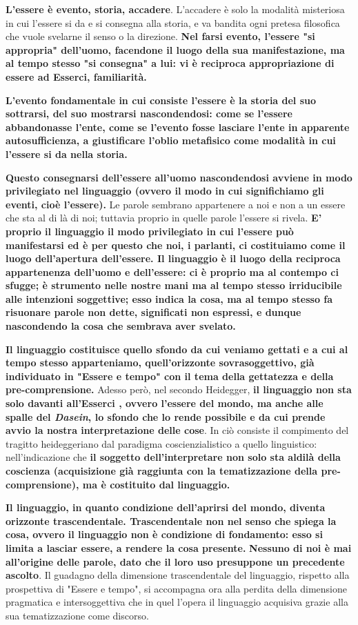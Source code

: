 \textbf{L'essere è evento, storia, accadere}. L'accadere è
solo la modalità misteriosa in cui l'essere si da e si
consegna alla storia, e va bandita ogni pretesa
filosofica che vuole svelarne il senso o la direzione.
\textbf{Nel farsi evento, l'essere "si appropria" dell'uomo,
facendone il luogo della sua manifestazione,
ma al tempo stesso "si consegna" a lui: vi è
reciproca appropriazione di essere ad Esserci,
familiarità.}

\textbf{L'evento fondamentale in cui consiste l'essere è la
storia del suo sottrarsi, del suo mostrarsi nascondendosi:
come se l'essere abbandonasse l'ente, come se
l'evento fosse lasciare l'ente in apparente autosufficienza,
a giustificare l'oblio metafisico come modalità
in cui l'essere si da nella storia.}

\textbf{Questo consegnarsi dell'essere all'uomo nascondendosi avviene in modo privilegiato
nel linguaggio (ovvero il modo in cui significhiamo gli eventi, cioè l'essere).}
Le parole sembrano appartenere a noi e non a un
essere che sta al di là di noi; tuttavia proprio in
quelle parole l'essere si rivela.\textbf{ E' proprio il linguaggio
il modo privilegiato in cui l'essere può manifestarsi
ed è per questo che noi, i parlanti, ci
costituiamo come il luogo dell'apertura
dell'essere.
Il linguaggio è il luogo della reciproca appartenenza dell'uomo e dell'essere: ci è proprio ma
al contempo ci sfugge; è strumento nelle
nostre mani ma al tempo stesso irriducibile alle
intenzioni soggettive; esso indica la cosa, ma
al tempo stesso fa risuonare parole non dette,
significati non espressi, e dunque nascondendo
la cosa che sembrava aver svelato.}

\textbf{Il linguaggio costituisce quello sfondo da cui
veniamo gettati e a cui al tempo stesso
apparteniamo, quell'orizzonte sovrasoggettivo,
già individuato in "Essere e tempo" con
il tema della gettatezza e della 
pre-comprensione.}
Adesso però, nel secondo Heidegger, \textbf{il linguaggio
non sta solo davanti all'Esserci , ovvero
l'essere del mondo, ma anche alle spalle del
\textit{Dasein}, lo sfondo che lo rende possibile e da cui
prende avvio la nostra interpretazione delle cose}.
In ciò consiste il compimento del tragitto
heideggeriano dal paradigma coscienzialistico a quello
linguistico: nell'indicazione che \textbf{il soggetto dell'interpretare non solo sta aldilà della
coscienza (acquisizione già raggiunta con la
tematizzazione della pre-comprensione), ma
è costituito dal linguaggio.}


\textbf{Il linguaggio,
in quanto condizione dell'aprirsi del mondo,
diventa orizzonte trascendentale.
Trascendentale non nel senso che spiega la cosa, ovvero il linguaggio
non è condizione di fondamento:
esso si limita a lasciar essere, a
rendere la cosa presente.}
\textbf{Nessuno di noi è mai all'origine delle parole,
dato che il loro uso presuppone un precedente
ascolto}. Il guadagno della dimensione
trascendentale del linguaggio, rispetto alla
prospettiva di "Essere e tempo", si accompagna
ora alla perdita della dimensione pragmatica
e intersoggettiva che in quel l'opera il linguaggio
acquisiva grazie alla sua tematizzazione come
discorso.

